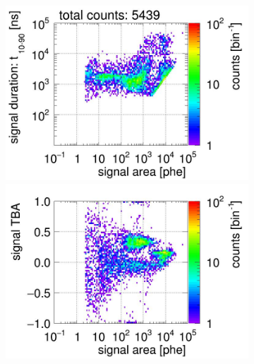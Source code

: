 \begin{landscape}
\begin{figure}[!p]
\begin{subfigure}[t]{0.32\textwidth}
	\caption{}
	\label{fig:signal selection 05}
\end{subfigure}
	\begin{subfigure}[t]{0.32\textwidth}
	\centering
	\includegraphics[width=\figurewidth,clip,trim={0 98 0 15}]{Figures/GasTest/CutsValid/res64767/pdpa06Vecfig64767.jpg}
	\includegraphics[width=\figurewidth,clip,trim={0 98 0 40}]{Figures/GasTest/CutsValid/res64767/tbapa06Vecfig64767.jpg}

\end{subfigure}
\end{figure}
\end{landscape}
